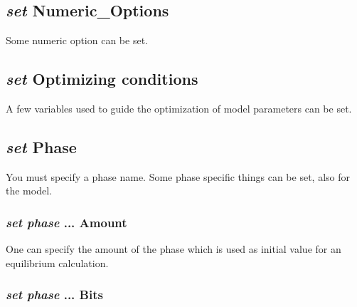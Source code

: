\documentclass[12pt]{article}
\begin{document}
\subsection{{\em set} Numeric\_Options}

Some numeric option can be set.

\subsection{{\em set} Optimizing conditions}

A few variables used to guide the optimization of model parameters can
be set.

\subsection{{\em set} Phase}

You must specify a phase name.  Some phase specific things can be set,
also for the model.

\subsubsection{{\em set phase} ... Amount}

One can specify the amount of the phase which is used as initial value
for an equilibrium calculation.

\subsubsection{{\em set phase} ... Bits}
\end{document}
